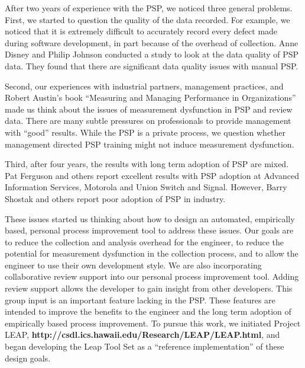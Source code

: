 After two years of experience with the PSP, we noticed three general
problems.  First, we started to question the quality of the data recorded.
For example, we noticed that it is extremely difficult to accurately record
every defect made during software development, in part because of the
overhead of collection.  Anne Disney and Philip Johnson conducted a study
to look at the data quality of PSP data.  They found that there are
significant data quality issues with manual PSP.\cite{Disney98}

Second, our experiences with industrial partners, management practices, and
Robert Austin's book ``Measuring and Managing Performance in
Organizations''\cite{Austin96} made us think about the issues of
measurement dysfunction in PSP and review data.  There are many subtle
pressures on professionals to provide management with ``good'' results.
While the PSP is a private process, we question whether management directed
PSP training might not induce measurement dysfunction.

Third, after four years, the results with long term adoption of PSP are
mixed.  Pat Ferguson and others report excellent results with PSP adoption
at Advanced Information Services, Motorola and Union Switch and
Signal\cite{Ferguson97}.  However, Barry Shostak and others report poor
adoption of PSP in industry\cite{Shostak96,Emam96}.


These issues started us thinking about how to design an automated,
empirically based, personal process improvement tool to address these
issues.  Our goals are to reduce the collection and analysis overhead for
the engineer, to reduce the potential for measurement dysfunction in the
collection process, and to allow the engineer to use their own development
style.  We are also incorporating collaborative review support into our
personal process improvement tool.  Adding review support allows the
developer to gain insight from other developers.  This group input is an
important feature lacking in the PSP.  These features are intended to
improve the benefits to the engineer and the long term adoption of
empirically based process improvement.  To pursue this work, we initiated
Project LEAP, {\bf http://csdl.ics.hawaii.edu/Research/LEAP/LEAP.html}, and
began developing the Leap Tool Set as a ``reference implementation'' of
these design goals.

